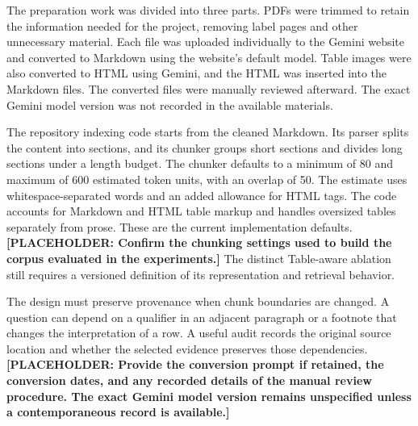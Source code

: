 \documentclass[oneside]{sn-jnl}
\newcommand{\pending}[1]{\textbf{\textcolor{red!65!black}{[PLACEHOLDER: #1]}}}
\begin{document}
The preparation work was divided into three parts. PDFs were trimmed to retain the information needed for the project, removing label pages and other unnecessary material. Each file was uploaded individually to the Gemini website and converted to Markdown using the website's default model. Table images were also converted to HTML using Gemini, and the HTML was inserted into the Markdown files. The converted files were manually reviewed afterward. The exact Gemini model version was not recorded in the available materials.

The repository indexing code starts from the cleaned Markdown. Its parser splits the content into sections, and its chunker groups short sections and divides long sections under a length budget. The chunker defaults to a minimum of 80 and maximum of 600 estimated token units, with an overlap of 50. The estimate uses whitespace-separated words and an added allowance for HTML tags. The code accounts for Markdown and HTML table markup and handles oversized tables separately from prose. These are the current implementation defaults. \pending{Confirm the chunking settings used to build the corpus evaluated in the experiments.} The distinct Table-aware ablation still requires a versioned definition of its representation and retrieval behavior.

The design must preserve provenance when chunk boundaries are changed. A question can depend on a qualifier in an adjacent paragraph or a footnote that changes the interpretation of a row. A useful audit records the original source location and whether the selected evidence preserves those dependencies.
\pending{Provide the conversion prompt if retained, the conversion dates, and any recorded details of the manual review procedure. The exact Gemini model version remains unspecified unless a contemporaneous record is available.}
\end{document}
